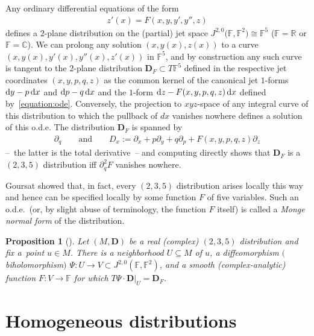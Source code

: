 \documentclass[pdftex]{sigma}
\newcommand{\bbC}{\mathbb{C}}
\newcommand{\bbF}{\mathbb{F}}
\newcommand{\bbR}{\mathbb{R}}
\newcommand{\mbD}{\mathbf{D}}
\numberwithin{equation}{section}
\newtheorem{Proposition}[Theorem]{Proposition}
\begin{document}
Any ordinary differential equations of the form
\begin{gather}\label{equation:ode}
	z'(x) = F(x, y, y', y'', z)
\end{gather}
defines a $2$-plane distribution on the (partial) jet space $J^{2, 0}\big(\bbF, \bbF^2\big) \cong \bbF^5$ ($\bbF = \bbR$ or $\bbF = \bbC$). We can prolong any solution $(x, y(x), z(x))$ to a curve $(x, y(x), y'(x), y''(x), z'(x))$ in $\bbF^5$, and by construction any such curve is tangent to the $2$-plane distribution $\mbD_F \subset T \bbF^5$ defined in the respective jet coordinates $(x, y, p, q, z)$ as the common kernel of the canonical jet $1$-forms ${\rm d}y - p \,{\rm d}x$ and ${\rm d}p - q \,{\rm d}x$ and the $1$-form ${\rm d}z - F(x, y, p, q, z) \,{\rm d}x$ defined by~\eqref{equation:ode}. Conversely, the projection to $xyz$-space of any integral curve of this distribution to which the pullback of $dx$ vanishes nowhere defines a solution of this o.d.e. The distribution $\mbD_F$ is spanned by
\begin{gather*}
	\partial_q
		\qquad \textrm{and} \qquad
	D_x := \partial_x + p \partial_y + q \partial_p + F(x, y, p, q, z) \partial_z
\end{gather*}
--~the latter is the total derivative~-- and computing directly shows that $\mbD_F$ is a $(2, 3, 5)$ distribution iff $\partial_q^2 F$ vanishes nowhere.

Goursat showed that, in fact, every $(2, 3, 5)$ distribution arises locally this way and hence can be specified locally by some function $F$ of five variables. Such an o.d.e.\ (or, by slight abuse of terminology, the function $F$ itself) is called a \textit{Monge normal form} of the distribution.
\begin{Proposition}[{\cite[Section~76]{Goursat}}]
Let $(M, \mbD)$ be a real (complex) $(2, 3, 5)$ distribution and fix a~point $u \in M$. There is a neighborhood $U \subseteq M$ of $u$, a diffeomorphism $($biholomorphism$)$ $\Psi\colon U \to V \subset J^{2, 0}(\bbF, \bbF^2)$, and a smooth (complex-analytic) function $F\colon V \to \bbF$ for which $T\Psi \cdot \mbD\vert_U = \mbD_F$.
\end{Proposition}

\section{Homogeneous distributions}
\end{document}
